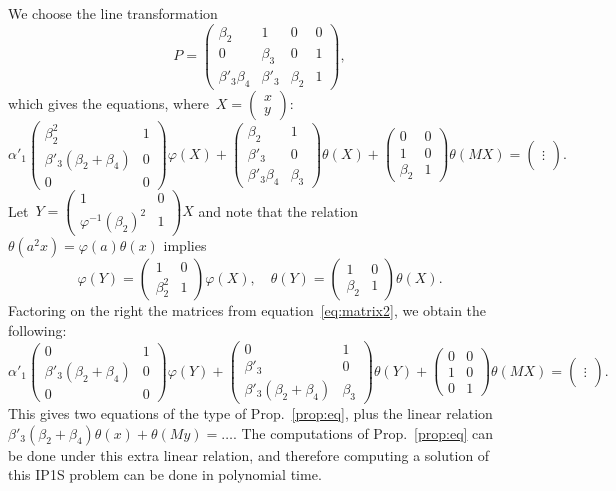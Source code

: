 \documentclass{llncs}
\def\mat#1{\begin{pmatrix}#1\end{pmatrix}}
\begin{document}
We choose the line transformation
\begin{equation}\label{eq:line-transform}
P = \mat{ β_2 & 1 & 0 & 0 \\ 0 & β_3 & 0 & 1 \\ β'_3 β_4 & β'_3 & β_2 & 1},
\end{equation}
which gives the equations, where~$X = \mat{x\\y}$:
\begin{equation}\label{eq:matrix2}
α'_1 \mat{β_2^2 & 1 \\ β'_3 (β_2 + β_4) & 0 \\ 0 & 0} φ (X)
+ \mat{β_2 & 1 \\ β'_3 & 0 \\ β'_3 β_4 & β_3} θ (X)
+ \mat{0 & 0 \\ 1 & 0 \\ β_2 & 1} θ (MX) =
\mat{ {} \\ ⋮ \\ {} }.
\end{equation}
Let~$Y = \mat{1 & 0 \\ φ^{-1}(β_2)^2 & 1} X$ and note that the
relation~$θ(a^2 x) = φ(a) θ(x)$ implies
\begin{equation}
φ(Y) = \mat{1 & 0 \\ β_2^2 & 1} φ(X), \quad
θ(Y) = \mat{1 & 0 \\ β_2 & 1} θ(X).
\end{equation}
Factoring on the right the matrices from equation~\eqref{eq:matrix2}, we
obtain the following:
\begin{equation}\label{eq:matrix3}
α'_1 \mat{0 & 1 \\β'_3 (β_2 + β_4) & 0 \\ 0 & 0} φ(Y)
+ \mat{0 & 1 \\ β'_3 & 0 \\ β'_3(β_2 + β_4) & β_3} θ(Y)
+ \mat{0 & 0 \\ 1 & 0 \\ 0 & 1} θ(MX) =
\mat{ {} \\ ⋮ \\ {} }.
\end{equation}
This gives two equations of the type of Prop.~\ref{prop:eq}, plus the
linear relation $β'_3 (β_2 + β_4) θ(x) + θ(My) = …$. The computations of
Prop.~\ref{prop:eq} can be done under this extra linear relation, and
therefore computing a solution of this IP1S problem can be done in
polynomial time.
\end{document}
